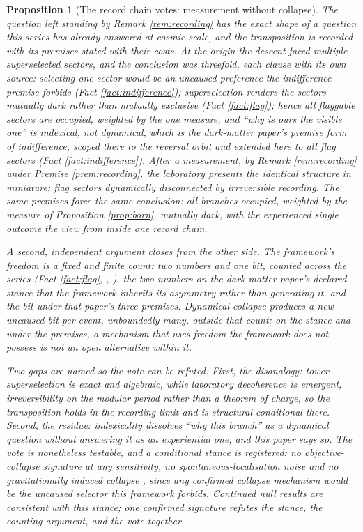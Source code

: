 \documentclass[11pt]{article}
\newtheorem{proposition}[theorem]{Proposition}
\theoremstyle{definition}
\begin{document}
\begin{proposition}[The record chain votes: measurement without collapse]\label{prop:vote}
The question left standing by Remark \ref{rem:recording} has the exact shape of a question this series has already answered at cosmic scale, and the transposition is recorded with its premises stated with their costs. At the origin the descent faced multiple superselected sectors, and the conclusion was threefold, each clause with its own source: selecting one sector would be an uncaused preference the indifference premise forbids (Fact \ref{fact:indifference}); superselection renders the sectors mutually \emph{dark} rather than mutually exclusive (Fact \ref{fact:flag}); hence all flaggable sectors are occupied, weighted by the one measure, and ``why is ours the visible one'' is indexical, not dynamical, which is the dark-matter paper's premise form of indifference, scoped there to the reversal orbit and extended here to all flag sectors (Fact \ref{fact:indifference}). After a measurement, by Remark \ref{rem:recording} under Premise \ref{prem:recording}, the laboratory presents the identical structure in miniature: flag sectors dynamically disconnected by irreversible recording. The same premises force the same conclusion: all branches occupied, weighted by the measure of Proposition \ref{prop:born}, mutually dark, with the experienced single outcome the view from inside one record chain.

A second, independent argument closes from the other side. The framework's freedom is a \emph{fixed and finite count}: two numbers and one bit, counted across the series (Fact \ref{fact:flag}, \cite[Prop.~7.6]{ButlerT12}, \cite[Prop.~5.1, Prop.~5.2]{ButlerT14}), the two numbers on the dark-matter paper's declared stance that the framework inherits its asymmetry rather than generating it, and the bit under that paper's three premises. Dynamical collapse produces a new uncaused bit per event, unboundedly many, outside that count; on the stance and under the premises, a mechanism that uses freedom the framework does not possess is not an open alternative within it.

Two gaps are named so the vote can be refuted. First, the \emph{disanalogy}: tower superselection is exact and algebraic, while laboratory decoherence is emergent, irreversibility on the modular period rather than a theorem of charge, so the transposition holds in the recording limit and is structural-conditional there. Second, the \emph{residue}: indexicality dissolves ``why this branch'' as a dynamical question without answering it as an experiential one, and this paper says so. The vote is nonetheless testable, and a conditional stance is registered: no objective-collapse signature at any sensitivity, no spontaneous-localisation noise and no gravitationally induced collapse \cite{GRW1986, Penrose1996}, since any confirmed collapse mechanism would be the uncaused selector this framework forbids. Continued null results are consistent with this stance; one confirmed signature refutes the stance, the counting argument, and the vote together.
\end{proposition}
\end{document}
